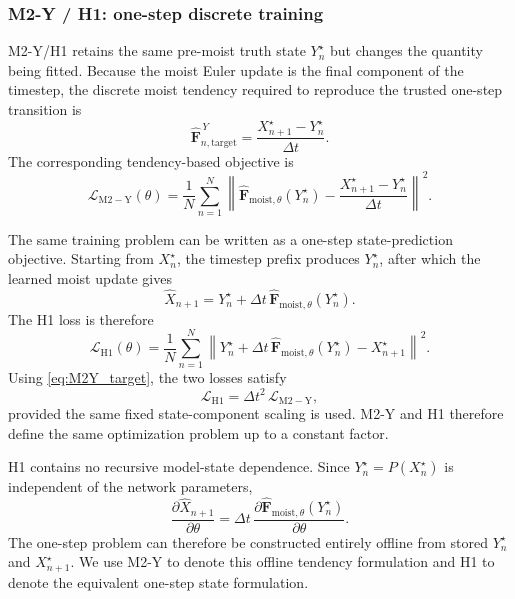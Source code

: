 \documentclass[12pt]{article}
\begin{document}
\subsubsection{M2-Y / H1: one-step discrete training}

M2-Y/H1 retains the same pre-moist truth state $Y_n^\star$ but changes the
quantity being fitted. Because the moist Euler update is the final component
of the timestep, the discrete moist tendency required to reproduce the trusted
one-step transition is
\begin{equation}
	\widehat{\mathbf F}_{n,\mathrm{target}}^{\,Y}
	=
	\frac{X_{n+1}^\star-Y_n^\star}{\Delta t}.
	\label{eq:M2Y_target}
\end{equation}
The corresponding tendency-based objective is
\begin{equation}
	\mathcal{L}_{\mathrm{M2-Y}}(\theta)
	=
	\frac{1}{N}
	\sum_{n=1}^{N}
	\left\|
	\widehat{\mathbf F}_{\mathrm{moist},\theta}(Y_n^\star)
	-
	\frac{X_{n+1}^\star-Y_n^\star}{\Delta t}
	\right\|^2.
	\label{eq:M2Y_loss}
\end{equation}

The same training problem can be written as a one-step state-prediction
objective. Starting from $X_n^\star$, the timestep prefix produces
$Y_n^\star$, after which the learned moist update gives
\begin{equation}
	\widehat X_{n+1}
	=
	Y_n^\star
	+
	\Delta t\,
	\widehat{\mathbf F}_{\mathrm{moist},\theta}(Y_n^\star).
	\label{eq:H1_prediction}
\end{equation}
The H1 loss is therefore
\begin{equation}
	\mathcal{L}_{\mathrm{H1}}(\theta)
	=
	\frac{1}{N}
	\sum_{n=1}^{N}
	\left\|
	Y_n^\star
	+
	\Delta t\,
	\widehat{\mathbf F}_{\mathrm{moist},\theta}(Y_n^\star)
	-
	X_{n+1}^\star
	\right\|^2.
	\label{eq:H1_loss}
\end{equation}
Using \eqref{eq:M2Y_target}, the two losses satisfy
\begin{equation}
	\mathcal{L}_{\mathrm{H1}}
	=
	\Delta t^2\,
	\mathcal{L}_{\mathrm{M2-Y}},
	\label{eq:H1_M2Y_equivalence}
\end{equation}
provided the same fixed state-component scaling is used. M2-Y and H1
therefore define the same optimization problem up to a constant factor.

H1 contains no recursive model-state dependence. Since
$Y_n^\star=P(X_n^\star)$ is independent of the network parameters,
\begin{equation}
	\frac{\partial \widehat X_{n+1}}{\partial\theta}
	=
	\Delta t\,
	\frac{\partial
		\widehat{\mathbf F}_{\mathrm{moist},\theta}(Y_n^\star)}
	{\partial\theta}.
	\label{eq:H1_parameter_derivative}
\end{equation}
The one-step problem can therefore be constructed entirely offline from stored
$Y_n^\star$ and $X_{n+1}^\star$. We use M2-Y to denote this offline
tendency formulation and H1 to denote the equivalent one-step state
formulation.
\end{document}

